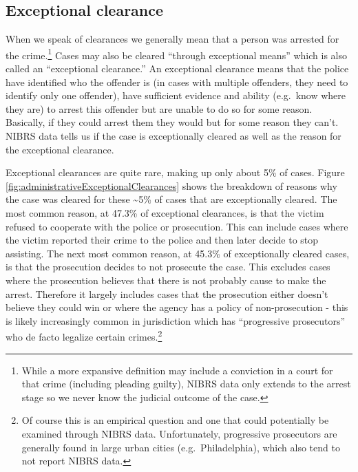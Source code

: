 \documentclass[
  12pt,
  openany]{book}
\begin{document}
\hypertarget{exceptional-clearance}{%
\subsection{Exceptional clearance}\label{exceptional-clearance}}

When we speak of clearances we generally mean that a person was arrested for the crime.\footnote{While a more expansive definition may include a conviction in a court for that crime (including pleading guilty), NIBRS data only extends to the arrest stage so we never know the judicial outcome of the case.} Cases may also be cleared ``through exceptional means'' which is also called an ``exceptional clearance.'' An exceptional clearance means that the police have identified who the offender is (in cases with multiple offenders, they need to identify only one offender), have sufficient evidence and ability (e.g.~know where they are) to arrest this offender but are unable to do so for some reason. Basically, if they could arrest them they would but for some reason they can't. NIBRS data tells us if the case is exceptionally cleared as well as the reason for the exceptional clearance.

Exceptional clearances are quite rare, making up only about 5\% of cases. Figure \ref{fig:administrativeExceptionalClearances} shows the breakdown of reasons why the case was cleared for these \textasciitilde5\% of cases that are exceptionally cleared. The most common reason, at 47.3\% of exceptional clearances, is that the victim refused to cooperate with the police or prosecution. This can include cases where the victim reported their crime to the police and then later decide to stop assisting. The next most common reason, at 45.3\% of exceptionally cleared cases, is that the prosecution decides to not prosecute the case. This excludes cases where the prosecution believes that there is not probably cause to make the arrest. Therefore it largely includes cases that the prosecution either doesn't believe they could win or where the agency has a policy of non-prosecution - this is likely increasingly common in jurisdiction which has ``progressive prosecutors'' who de facto legalize certain crimes.\footnote{Of course this is an empirical question and one that could potentially be examined through NIBRS data. Unfortunately, progressive prosecutors are generally found in large urban cities (e.g.~Philadelphia), which also tend to not report NIBRS data.}
\end{document}
